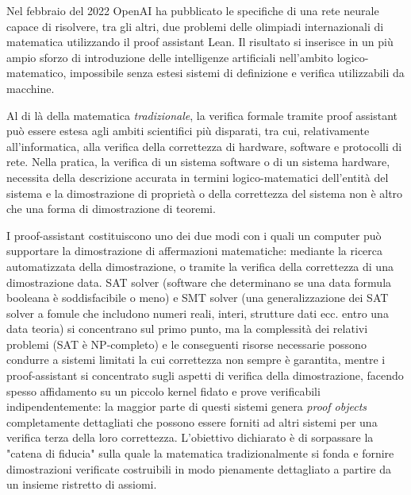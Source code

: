Nel febbraio del 2022 OpenAI ha pubblicato le specifiche \cite{openAILean} di una rete neurale capace di risolvere, tra gli altri, due problemi delle olimpiadi internazionali di matematica utilizzando il proof assistant Lean. Il risultato si inserisce in un più ampio sforzo di introduzione delle intelligenze artificiali nell'ambito logico-matematico, impossibile senza estesi sistemi di definizione e verifica utilizzabili da macchine.

Al di là della matematica \emph{tradizionale}, la verifica formale tramite proof assistant può essere estesa agli ambiti scientifici più disparati, tra cui, relativamente all'informatica, alla verifica della correttezza di hardware, software e protocolli di rete. Nella pratica, la verifica di un sistema software o di un sistema hardware, necessita della descrizione accurata in termini logico-matematici dell'entità del sistema e la dimostrazione di proprietà o della correttezza del sistema non è altro che una forma di dimostrazione di teoremi.

I proof-assistant costituiscono uno dei due modi con i quali un computer può supportare la dimostrazione di affermazioni matematiche: mediante la ricerca automatizzata della dimostrazione, o tramite la verifica della correttezza di una dimostrazione data. SAT solver (software che determinano se una data formula booleana è soddisfacibile o meno) e SMT solver (una generalizzazione dei SAT solver a fomule che includono numeri reali, interi, strutture dati ecc. entro una data teoria) si concentrano sul primo punto, ma la complessità dei relativi problemi (SAT è NP-completo) e le conseguenti risorse necessarie possono condurre a sistemi limitati la cui correttezza non sempre è garantita, mentre i proof-assistant si concentrato sugli aspetti di verifica della dimostrazione, facendo spesso affidamento su un piccolo kernel fidato e prove verificabili indipendentemente: la maggior parte di questi sistemi genera \emph{proof objects} completamente dettagliati che possono essere forniti ad altri sistemi per una verifica terza della loro correttezza. L'obiettivo dichiarato è di sorpassare la "catena di fiducia" sulla quale la matematica tradizionalmente si fonda e fornire dimostrazioni verificate costruibili in modo pienamente dettagliato a partire da un insieme ristretto di assiomi.


